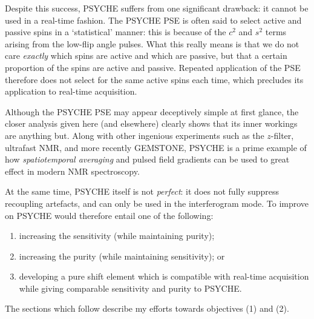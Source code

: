 Despite this success, PSYCHE suffers from one significant drawback: it cannot be used in a real-time fashion.
The PSYCHE PSE is often said to select active and passive spins in a `statistical' manner: this is because of the $c^2$ and $s^2$ terms arising from the low-flip angle pulses.
What this really means is that we do not care \textit{exactly} which spins are active and which are passive, but that a certain proportion of the spins are active and passive.
Repeated application of the PSE therefore does not select for the same active spins each time, which precludes its application to real-time acquisition.

Although the PSYCHE PSE may appear deceptively simple at first glance, the closer analysis given here (and elsewhere\autocite{Foroozandeh2018CEJ}) clearly shows that its inner workings are anything but.
Along with other ingenious experiments such as the $z$-filter\autocite{Thrippleton2005JMR}, ultrafast NMR\autocite{Frydman2002PNASUSA,Pelupessy2003JACS,Frydman2003JACS}, and more recently GEMSTONE\autocite{Kiraly2021ACIE}, PSYCHE is a prime example of how \textit{spatiotemporal averaging} and pulsed field gradients can be used to great effect in modern NMR spectroscopy.\autocite{Dumez2018PNMRS}

At the same time, PSYCHE itself is not \textit{perfect}: it does not fully suppress recoupling artefacts, and can only be used in the interferogram mode.
To improve on PSYCHE would therefore entail one of the following:
\begin{enumerate}
    \item increasing the sensitivity (while maintaining purity);
    \item increasing the purity (while maintaining sensitivity); or
    \item developing a pure shift element which is compatible with real-time acquisition while giving comparable sensitivity and purity to PSYCHE.
\end{enumerate}

The sections which follow describe my efforts towards objectives (1) and (2).
